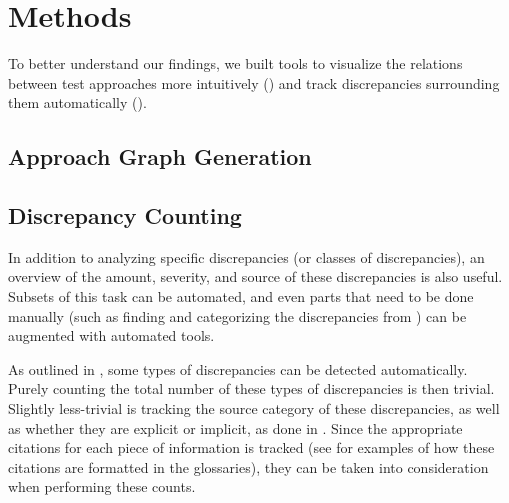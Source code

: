 \section{Methods}
\label{methods}

To better understand our findings, we built tools to visualize the
relations between test approaches more intuitively () and track
discrepancies surrounding them automatically ().

\subsection{Approach Graph Generation}
\label{graph-gen}

\graphGenDesc{}

\subsection{Discrepancy Counting}
\label{discrep-count}

In addition to analyzing specific discrepancies (or classes of discrepancies),
an overview of the amount, severity, and source of these discrepancies is also
useful. Subsets of this task can be automated, and even parts that need to be
done manually (such as finding and categorizing the discrepancies from
) can be augmented with automated tools.

As outlined in , some types of discrepancies can be detected
automatically. Purely counting the total number of these types of
discrepancies is then trivial. Slightly less-trivial is tracking the source
category of these discrepancies, as well as whether they are explicit or
implicit, as done in . Since the appropriate citations for
each piece of information is tracked (see  for examples of how these citations are formatted
in the glossaries), they can be taken into consideration when performing
these counts.